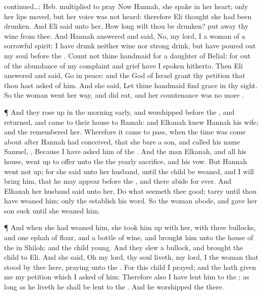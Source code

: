 {{continued…: Heb. multiplied to pray}
Now
Hannah, she
spake in her
heart; only her
lips
moved, but her
voice was not
heard: therefore
Eli
thought she had been
drunken.
And
Eli
said unto her, How long wilt thou be
drunken? put
away thy
wine from thee.
And
Hannah
answered and
said, No, my
lord, I
{} a
woman of a
sorrowful
spirit: I have
drunk neither
wine nor strong
drink, but have poured
out my
soul
before the
{}.
Count not thine
handmaid
for a
daughter of
Belial: for out of the
abundance of my
complaint and
grief have I
spoken hitherto.
Then
Eli
answered and
said,
Go in
peace: and the
God of
Israel
grant
{} thy
petition that thou hast
asked of him.
And she
said, Let thine
handmaid
find
grace in thy
sight. So the
woman
went her
way, and did
eat, and her
countenance was no more
{}.
\par }{\PP {}¶ And they rose
up in the
morning
early, and
worshipped
before the
{}, and
returned, and
came to their
house to
Ramah: and
Elkanah
knew
Hannah his
wife; and the
{}
remembered her.
Wherefore it came to pass, when the
time was
come about after
Hannah had
conceived, that she
bare a
son, and
called his
name
Samuel,
{}, Because I have
asked him of the
{}.
And the
man
Elkanah, and all his
house, went
up to
offer unto the
{} the
yearly
sacrifice, and his
vow.
But
Hannah went not
up; for she
said unto her
husband,
{} until the
child be
weaned, and
{} I will
bring him, that he may
appear
before the
{}, and there
abide
for
ever.
And
Elkanah her
husband
said unto her,
Do what
seemeth thee
good;
tarry until thou have
weaned him; only the
{}
establish his
word. So the
woman
abode, and gave her
son
suck until she
weaned him.
\par }{\PP {}¶ And when she had
weaned him, she took him
up with her, with
three
bullocks, and
one
ephah of
flour, and a
bottle of
wine, and
brought him unto the
house of the
{} in
Shiloh: and the
child
{}
young.
And they
slew a
bullock, and
brought the
child to
Eli.
And she
said,
Oh my
lord,
{} thy
soul
liveth, my
lord, I
{} the
woman that
stood by thee here,
praying unto the
{}.
For this
child I
prayed; and the
{} hath
given me my
petition which I
asked of him:
Therefore also I have
lent him to the
{}; as long as he
liveth he shall be
lent to the
{}. And he
worshipped the
{} there.

}
